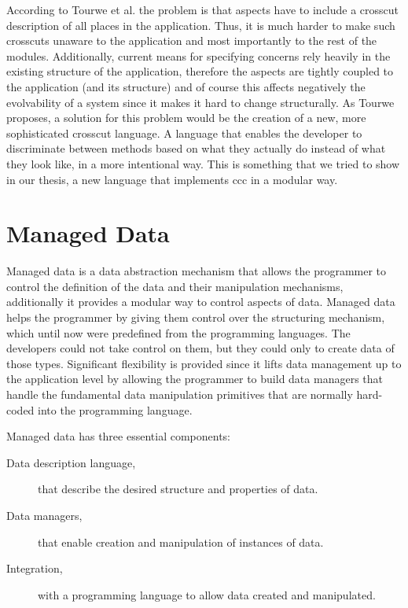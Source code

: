 According to Tourwe et al. \cite{tourwe2003existence} the problem is that aspects have to include a crosscut description of all places in the application. 
Thus, it is much harder to make such crosscuts unaware to the application and most importantly to the rest of the modules. 
Additionally, current means for specifying concerns rely heavily in the existing structure of the application, therefore the aspects are tightly coupled to the application (and its structure) and of course this affects negatively the evolvability of a system since it makes it hard to change structurally.
As Tourwe \cite{tourwe2003existence} proposes, a solution for this problem would be the creation of a new, more sophisticated crosscut language. 
A language that enables the developer to discriminate between methods based on what they actually do instead of what they look like, in a more intentional way.
This is something that we tried to show in our thesis, a new language that implements \ac{ccc} in a modular way.

\section{Managed Data}\label{Managed Data}
Managed data \cite{loh2012managed} is a data abstraction mechanism that allows the programmer to control the definition of the data and their manipulation mechanisms, additionally it provides a modular way to control aspects of data.
Managed data helps the programmer by giving them control over the structuring mechanism, which until now were predefined from the programming languages. 
The developers could not take control on them, but they could only to create data of those types.
Significant flexibility is provided since it lifts data management up to the application level by allowing the programmer to build data managers that handle the fundamental data manipulation primitives that are normally hard-coded into the programming language. 

Managed data has three essential components:

\begin{description}
	\item [Data description language,] that describe the desired structure and properties of data.
	\item [Data managers,] that enable creation and manipulation of instances of data.
	\item [Integration,] with a programming language to allow data created and manipulated.
\end{description}

